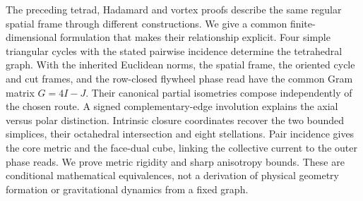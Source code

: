 The preceding tetrad, Hadamard and vortex proofs describe the same regular spatial frame through different constructions. We give a common finite-dimensional formulation that makes their relationship explicit. Four simple triangular cycles with the stated pairwise incidence determine the tetrahedral graph. With the inherited Euclidean norms, the spatial frame, the oriented cycle and cut frames, and the row-closed flywheel phase read have the common Gram matrix $G=4I-J$. Their canonical partial isometries compose independently of the chosen route. A signed complementary-edge involution explains the axial versus polar distinction. Intrinsic closure coordinates recover the two bounded simplices, their octahedral intersection and eight stellations. Pair incidence gives the core metric and the face-dual cube, linking the collective current to the outer phase reads. We prove metric rigidity and sharp anisotropy bounds. These are conditional mathematical equivalences, not a derivation of physical geometry formation or gravitational dynamics from a fixed graph.
